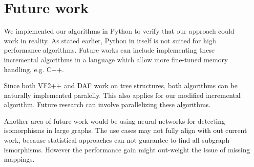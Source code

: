 \chapter{Future work}

We implemented our algorithms in Python to verify that our approach could work in reality. As stated earlier,
Python in itself is not suited for high performance algorithms. Future works can include implementing these
incremental algorithms in a language which allow more fine-tuned memory handling, e.g. C++.

Since both VF2++ and DAF work on tree structures, both algorithms can be naturally implemented paralelly. This
also applies for our modified incremental algorithm. Future research can involve parallelizing these algorithms.

Another area of future work would be using neural networks for detecting isomorphisms in large graphs. The use 
cases may not fully align with out current work, because statistical approaches can not guarantee to find all
subgraph ismorphisms. However the performance gain might out-weight the issue of missing mappings.
